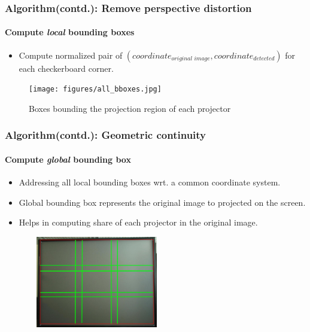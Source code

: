 \documentclass[40pt]{beamer}
\begin{document}
\begin{frame}
\frametitle{Algorithm(contd.): Remove perspective distortion}
\framesubtitle{Compute \textit{local} bounding boxes}
\begin{itemize}
\item Compute normalized pair of $(coordinate_{\textit{original image}}, coordinate_{\textit{detected}})$ for each checkerboard corner.
\end{itemize}

\begin{figure}
\texttt{[image: figures/all\_bboxes.jpg]}
\caption{Boxes bounding the projection region of each projector}
\end{figure}

\end{frame}


\begin{frame}
\frametitle{Algorithm(contd.): Geometric continuity}
\framesubtitle{Compute \textit{global} bounding box}
\begin{itemize}
\item Addressing all local bounding boxes wrt. a common coordinate system. 
\item Global bounding box represents the original image to projected on the screen.
\item Helps in computing share of each projector in the original image.
\end{itemize}

\begin{figure}
\includegraphics[width=6cm,height=4cm]{figures/test.jpg}
\end{figure}
\end{frame}

\end{document}
